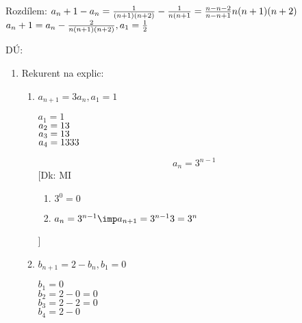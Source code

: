 Rozdílem: $a_n+1-a_n = \frac{1}{(n+1)(n+2)}-\frac{1}{n(n+1} = \frac{n-n-2}{n-n+1}{n(n+1)(n+2)}$\\
$a_n+1 = a_n - \frac2{n(n+1)(n+2)},a_1=\frac 12$

DÚ:
\begin{enumerate}
	\item Rekurent na explic:
		\begin{enumerate}
			\item $a_{n+1}=3a_n,a_1=1$

				$a_1 = 1$\\
				$a_2 = 1\*3$\\
				$a_3 = 1\*3\*$\\
				$a_4 = 1\*3\*3\*3$

				$$a_n = 3^{n-1}$$
				[Dk: MI
				\begin{enumerate}
					\item $3^0=0$
					\item $a_n = 3^{n-1} \imp a_{n+1} = 3^{n-1}\*3=3^{n}$
				\end{enumerate}
				]
			\item $b_{n+1}=2-b_n,b_1=0$

				$b_1=0$\\
				$b_2=2-0=0$\\
				$b_3=2-2=0$\\
				$b_4=2-0$


\end{enumerate}
\end{enumerate}
